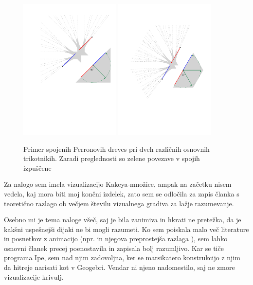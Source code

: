 \documentclass[a4paper, 12pt]{article}
\begin{document}
\begin{figure}[h!]
    \centering
    \includegraphics[width=0.45\textwidth]{ipe_slike/koncni_lik_90_napol_spoji.pdf}
    \includegraphics[width=0.45\textwidth]{ipe_slike/koncni_lik_60_napol_spoji.pdf}
    \caption{Primer spojenih Perronovih dreves pri dveh različnih osnovnih trikotnikih. Zaradi preglednosti so zelene povezave v spojih izpuščene}
    \label{60_90}
\end{figure}

Za nalogo sem imela vizualizacijo Kakeya-množice, ampak na začetku nisem vedela, kaj mora biti moj končni izdelek, zato sem se odločila za zapis članka s teoretično razlago ob večjem številu vizualnega gradiva za lažje razumevanje.

Osebno mi je tema naloge všeč, saj je bila zanimiva in hkrati ne pretežka, da je kakšni uspešnejši dijaki ne bi mogli razumeti. Ko sem poiskala malo več literature in posnetkov z animacijo (npr. \cite{YTNumberphile} in njegova preprostejša razlaga \cite{YTrazlaga}), sem lahko osnovni članek precej poenostavila in zapisala bolj razumljivo. Kar se tiče programa Ipe, sem nad njim zadovoljna, ker se marsikatero konstrukcijo z njim da hitreje narisati kot v Geogebri. Vendar ni njeno nadomestilo, saj ne zmore vizualizacije krivulj.

\newpage
\nocite{*}      %
\printbibliography[heading=bibintoc, title={Literatura}]

\end{document}
